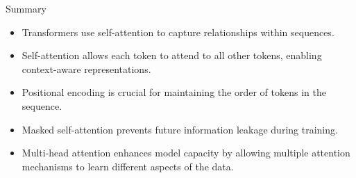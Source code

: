 \begin{frame}[allowframebreaks]{Summary}
    \begin{itemize}
        \item Transformers use self-attention to capture relationships within sequences.
        \item Self-attention allows each token to attend to all other tokens, enabling context-aware representations.
        \item Positional encoding is crucial for maintaining the order of tokens in the sequence.
        \item Masked self-attention prevents future information leakage during training.
        \item Multi-head attention enhances model capacity by allowing multiple attention mechanisms to learn different aspects of the data.
    \end{itemize}
\end{frame}